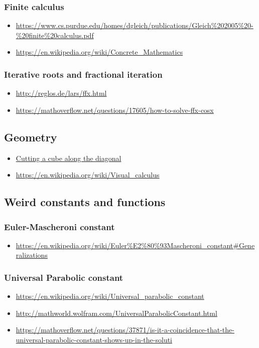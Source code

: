 \subsubsection{Finite calculus}
\begin{itemize}
\item \url{https://www.cs.purdue.edu/homes/dgleich/publications/Gleich\%202005\%20-\%20finite\%20calculus.pdf}
\item \url{https://en.wikipedia.org/wiki/Concrete_Mathematics}
\end{itemize}

\subsubsection{Iterative roots and fractional iteration}
\begin{itemize}
\item \url{http://reglos.de/lars/ffx.html}
\item \url{https://mathoverflow.net/questions/17605/how-to-solve-ffx-cosx}
\end{itemize}

\subsection{Geometry}
\begin{itemize}
\item \href{https://www.friedrich-verlag.de/fileadmin/redaktion/sekundarstufe/Mathematik/Der_Mathematikunterricht/Leseproben/Der_Mathematikunterricht_3_13_Leseprobe_2.pdf}{Cutting a cube along the diagonal}
\item \url{https://en.wikipedia.org/wiki/Visual_calculus}
\end{itemize}

\subsection{Weird constants and functions}

\subsubsection{Euler-Mascheroni constant}
\begin{itemize}
\item \url{https://en.wikipedia.org/wiki/Euler\%E2\%80\%93Mascheroni_constant#Generalizations}
\end{itemize}

\subsubsection{Universal Parabolic constant}
\begin{itemize}
\item \url{https://en.wikipedia.org/wiki/Universal_parabolic_constant}
\item \url{http://mathworld.wolfram.com/UniversalParabolicConstant.html}
\item \url{https://mathoverflow.net/questions/37871/is-it-a-coincidence-that-the-universal-parabolic-constant-shows-up-in-the-soluti}
\end{itemize}


